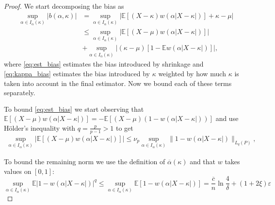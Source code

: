 \documentclass{article}
\theoremstyle{plain}
\theoremstyle{definition}
\def\eps{\varepsilon}
\newcommand{\E}{\mathbb{E}} %
\begin{document}
\begin{appendix}
	{\renewcommand{\proofname}{Proof of \Cref{lemma:bias_order}}
	\begin{proof}
		We start decomposing the bias as
		\begin{align}
      \sup_{\alpha\in I_\alpha(\kappa)}\lvert  b(\alpha,\kappa )\rvert  & = \sup_{\alpha\in I_\alpha(\kappa)} \lvert  \E[(X-\kappa)w(\alpha |X-\kappa|)]+\kappa-\mu\rvert \nonumber \\
                                                                                     & \leq \sup_{\alpha\in I_\alpha(\kappa)}\lvert  \E[(X-\mu)w(\alpha |X-\kappa|)]\rvert \label{eq:est_bias} \\&+ \sup_{\alpha\in I_\alpha(\kappa)}\lvert  (\kappa-\mu)[1-\E w(\alpha |X-\kappa|)]\rvert \label{eq:kappa_bias},
		\end{align}
		where \eqref{eq:est_bias} estimates the bias introduced by shrinkage and \eqref{eq:kappa_bias} estimates the bias introduced by $\kappa$ weighted by how much $\kappa$ is taken into account in the final estimator. Now we bound each of these terms separately.

		To bound \eqref{eq:est_bias} we start observing that
		$\E[(X-\mu)w(\alpha |X-\kappa|)] = - \E[(X-\mu)(1-w(\alpha |X-\kappa|))]$
		and use Hölder's inequality with $q = \frac{p}{p-1} > 1$ to get
		\begin{align*}
      \sup_{\alpha\in I_\alpha(\kappa)}\lvert  \E[(X-\mu)w(\alpha |X-\kappa|)]\rvert 
			\leq\nu_p\sup_{\alpha\in I_\alpha(\kappa)}\lVert  1-w(\alpha |X-\kappa|)\rVert_{L_q(P)},
		\end{align*}

		To bound the remaining norm we use the definition of $\overline{\alpha}(\kappa)$ and that $w$ takes values on $[0,1]$:
		\[ \sup_{\alpha\in I_\alpha(\kappa)}\E |1 - w(\alpha |X-\kappa| )|^q \leq \sup_{\alpha\in I_\alpha(\kappa)}\E\left[ 1 - w(\alpha |X-\kappa| ) \right] = \frac{\overline{c} }{n}\ln\frac{4}{\delta }+(1+2\xi )\eps  \]


\end{proof}}
\end{appendix}
\end{document}
